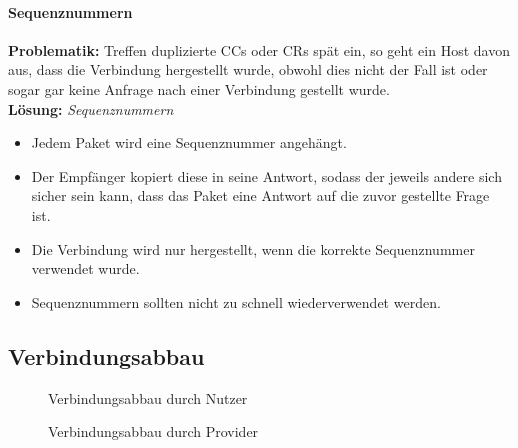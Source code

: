 			\paragraph{Sequenznummern}
				\textbf{Problematik:} Treffen duplizierte CCs oder CRs spät ein, so geht ein Host davon aus, dass die Verbindung hergestellt wurde, obwohl dies nicht der Fall ist oder sogar gar keine Anfrage nach einer Verbindung gestellt wurde. \\
				\textbf{Lösung:} \textit{Sequenznummern}

				\begin{itemize}
					\item Jedem Paket wird eine Sequenznummer angehängt.
					\item Der Empfänger kopiert diese in seine Antwort, sodass der jeweils andere sich sicher sein kann, dass das Paket eine Antwort auf die zuvor gestellte Frage ist.
					\item Die Verbindung wird nur hergestellt, wenn die korrekte Sequenznummer verwendet wurde.
					\item Sequenznummern sollten nicht zu schnell wiederverwendet werden.
				\end{itemize}

		\subsection{Verbindungsabbau}
			\begin{figure}[H]
				\centering
				\caption{Verbindungsabbau durch Nutzer}
			\end{figure}

			\begin{figure}[H]
				\centering
				\caption{Verbindungsabbau durch Provider}
			\end{figure}

